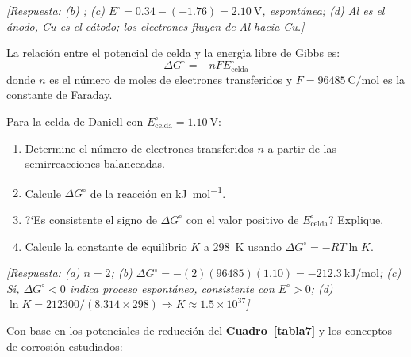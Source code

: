 \begin{bloque_ejercicios}
\begin{ejercicios}
\textit{[Respuesta:
(b) ;
(c) $E^\circ = 0.34 - (-1.76) = \SI{2.10}{\volt}$, espont\'anea;
(d) Al es el \'anodo, Cu es el c\'atodo; los electrones fluyen de Al hacia Cu.]}

\item La relaci\'on entre el potencial de celda y la energ\'{\i}a libre de
Gibbs es:
\[
    \Delta G^\circ = -nFE^\circ_{\text{celda}}
\]
donde $n$ es el n\'umero de moles de electrones transferidos y
$F = \SI{96485}{\coulomb\per\mole}$ es la constante de Faraday.

Para la celda de Daniell 
con $E^\circ_{\text{celda}} = \SI{1.10}{\volt}$:

\begin{enumerate}[label=\alph*)]
    \item Determine el n\'umero de electrones transferidos $n$ a partir
          de las semirreacciones balanceadas.
    \item Calcule $\Delta G^\circ$ de la reacci\'on en \si{\kilo\joule\per\mole}.
    \item ?`Es consistente el signo de $\Delta G^\circ$ con el valor
          positivo de $E^\circ_{\text{celda}}$? Explique.
    \item Calcule la constante de equilibrio $K$ a \SI{298}{\kelvin}
          usando $\Delta G^\circ = -RT\ln K$.
\end{enumerate}

\textit{[Respuesta:
(a) $n = 2$;
(b) $\Delta G^\circ = -(2)(96485)(1.10) = \SI{-212.3}{\kilo\joule\per\mole}$;
(c) S\'{\i}, $\Delta G^\circ < 0$ indica proceso espont\'aneo, consistente con
    $E^\circ > 0$;
(d) $\ln K = 212300/(8.314 \times 298) \Rightarrow K \approx 1.5 \times 10^{37}$]}

\item Con base en los potenciales de reducci\'on del
\textbf{Cuadro~\ref{tabla7}} y los conceptos de corrosi\'on estudiados:


\end{ejercicios}
\end{bloque_ejercicios}
